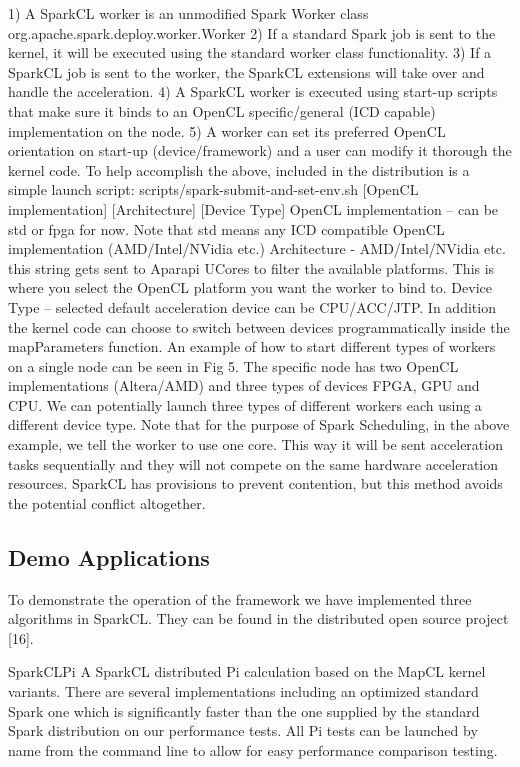 \documentclass[runningheads,a4paper]{llncs}
\begin{document}
1) A SparkCL worker is an unmodified Spark Worker class org.apache.spark.deploy.worker.Worker
2) If a standard Spark job is sent to the kernel, it will be executed using the standard worker class functionality.
3) If a SparkCL job is sent to the worker, the SparkCL extensions will take over and handle the acceleration.
4) A SparkCL worker is executed using start-up scripts that make sure it binds to an OpenCL specific/general (ICD capable) implementation on the node.
5) A worker can set its preferred OpenCL orientation on start-up (device/framework) and a user can modify it thorough the kernel code.
To help accomplish the above, included in the distribution is a simple launch script:
scripts/spark-submit-and-set-env.sh [OpenCL implementation] [Architecture] [Device Type]
OpenCL implementation – can be std or fpga for now. Note that std means any ICD compatible OpenCL implementation (AMD/Intel/NVidia etc.)
Architecture - AMD/Intel/NVidia etc. this string gets sent to Aparapi UCores to filter the available platforms. This is where you select the OpenCL platform you want the worker to bind to.
Device Type – selected default acceleration device can be CPU/ACC/JTP. In addition the kernel code can choose to switch between devices programmatically inside the mapParameters function.
An example of how to start different types of workers on a single node can be seen in Fig 5. The specific node has two OpenCL implementations (Altera/AMD) and three types of devices FPGA, GPU and CPU. We can potentially launch three types of different workers each using a different device type. Note that for the purpose of Spark Scheduling, in the above example, we tell the worker to use one core. This way it will be sent acceleration tasks sequentially and they will not compete on the same hardware acceleration resources. SparkCL has provisions to prevent contention, but this method avoids the potential conflict altogether.

\subsection{Demo Applications}
To demonstrate the operation of the framework we have implemented three algorithms in SparkCL. They can be found in the distributed open source project [16].

SparkCLPi
A SparkCL distributed Pi calculation based on the MapCL kernel variants. There are several implementations including an optimized standard Spark one which is significantly faster than the one supplied by the standard Spark distribution on our performance tests. All Pi tests can be launched by name from the command line to allow for easy performance comparison testing.
\end{document}
